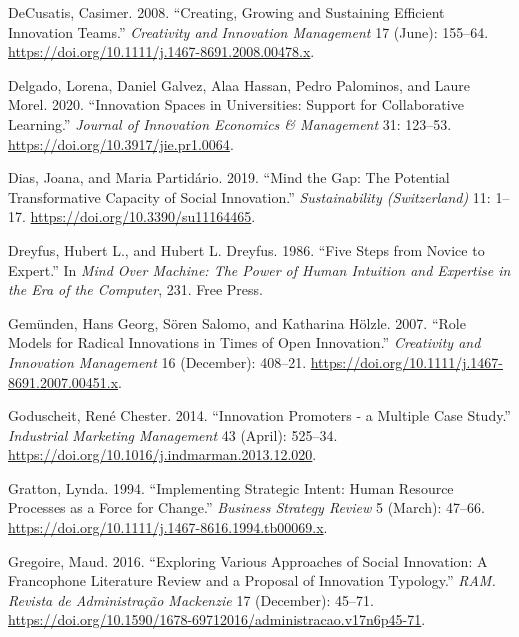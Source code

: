 \documentclass[AMA,STIX1COL,APA,STIX2COL]{WileyNJD-v2}
\newlength{\cslhangindent}
\newenvironment{CSLReferences}[2] %
 {%
  \setlength{\parindent}{0pt}
  \ifodd #1 \everypar{\setlength{\hangindent}{\cslhangindent}}\ignorespaces\fi
  \ifnum #2 > 0
  \setlength{\parskip}{#2\baselineskip}
  \fi
 }%
 {}
\begin{document}
\begin{CSLReferences}{1}{0}
\leavevmode{}%
DeCusatis, Casimer. 2008. {``Creating, Growing and Sustaining Efficient
Innovation Teams.''} \emph{Creativity and Innovation Management} 17
(June): 155--64. \url{https://doi.org/10.1111/j.1467-8691.2008.00478.x}.

\leavevmode{}%
Delgado, Lorena, Daniel Galvez, Alaa Hassan, Pedro Palominos, and Laure
Morel. 2020. {``Innovation Spaces in Universities: Support for
Collaborative Learning.''} \emph{Journal of Innovation Economics \&
Management} 31: 123--53. \url{https://doi.org/10.3917/jie.pr1.0064}.

\leavevmode{}%
Dias, Joana, and Maria Partidário. 2019. {``Mind the Gap: The Potential
Transformative Capacity of Social Innovation.''} \emph{Sustainability
(Switzerland)} 11: 1--17. \url{https://doi.org/10.3390/su11164465}.

\leavevmode{}%
Dreyfus, Hubert L., and Hubert L. Dreyfus. 1986. {``Five Steps from
Novice to Expert.''} In \emph{Mind Over Machine: The Power of Human
Intuition and Expertise in the Era of the Computer}, 231. Free Press.

\leavevmode{}%
Gemünden, Hans Georg, Sören Salomo, and Katharina Hölzle. 2007. {``Role
Models for Radical Innovations in Times of Open Innovation.''}
\emph{Creativity and Innovation Management} 16 (December): 408--21.
\url{https://doi.org/10.1111/j.1467-8691.2007.00451.x}.

\leavevmode{}%
Goduscheit, René Chester. 2014. {``Innovation Promoters - a Multiple
Case Study.''} \emph{Industrial Marketing Management} 43 (April):
525--34. \url{https://doi.org/10.1016/j.indmarman.2013.12.020}.

\leavevmode{}%
Gratton, Lynda. 1994. {``Implementing Strategic Intent: Human Resource
Processes as a Force for Change.''} \emph{Business Strategy Review} 5
(March): 47--66.
\url{https://doi.org/10.1111/j.1467-8616.1994.tb00069.x}.

\leavevmode{}%
Gregoire, Maud. 2016. {``Exploring Various Approaches of Social
Innovation: A Francophone Literature Review and a Proposal of Innovation
Typology.''} \emph{RAM. Revista de Administração Mackenzie} 17
(December): 45--71.
\url{https://doi.org/10.1590/1678-69712016/administracao.v17n6p45-71}.


\end{CSLReferences}
\end{document}
